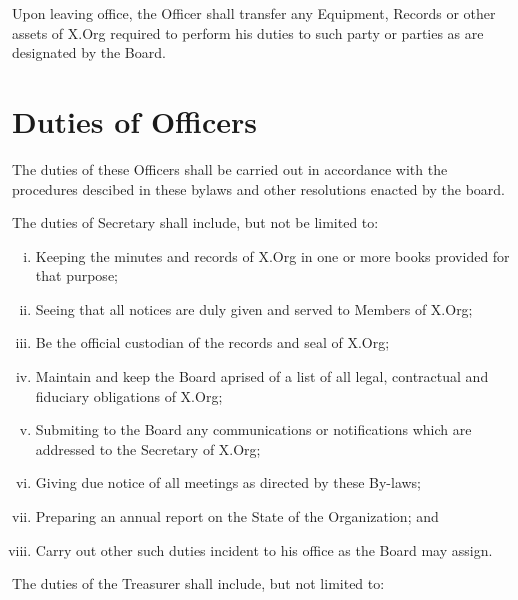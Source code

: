 \documentclass[10pt, english]{bylaws}
\begin{document}
Upon leaving office, the Officer shall transfer any Equipment, Records or other
assets of X.Org required to perform his duties to such party or parties as are
designated by the Board.

\section{Duties of Officers}
The duties of these Officers shall be carried out in accordance with the
procedures descibed in these bylaws and other resolutions enacted by the board.

The duties of Secretary shall include, but not be limited to:

\begin{enumerate}[(i)\hspace{.2cm}]
	\item Keeping the minutes and records of X.Org in one or more books
	provided for that purpose;

	\item Seeing that all notices are duly given and served to Members of
	X.Org;

	\item Be the official custodian of the records and seal of X.Org;

	\item Maintain and keep the Board aprised of a list of all legal,
	contractual and fiduciary obligations of X.Org;

	\item Submiting to the Board any communications or notifications which
	are addressed to the Secretary of X.Org;

	\item Giving due notice of all meetings as directed by these By-laws;

	\item Preparing an annual report on the State of the Organization; and

	\item Carry out other such duties incident to his office as the Board
	may assign.
\end{enumerate}

The duties of the Treasurer shall include, but not limited to:
\end{document}
